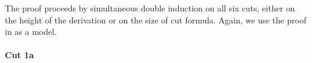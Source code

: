 





The proof proceeds by simultaneous double induction on all six cuts, either on
the height of the derivation or on the size of cut formula. Again, we use the
proof in \cite{chaudhuri-thesis} as a model.

\paragraph{Cut 1a}

